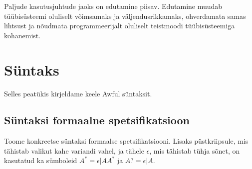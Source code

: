 \documentclass[12pt]{article}
\newcommand\peatykk[1]{
  \clearpage
  \section{#1}}
\begin{document}
      Paljude kasutusjuhtude jaoks on edutamine piisav. Edutamine muudab tüübisüsteemi oluliselt võimsamaks ja väljendusrikkamaks, ohverdamata samas lihtsust ja nõudmata programmeerijalt oluliselt teistmoodi tüübisüsteemiga kohanemist.
\begin{comment}
  \begin{frame}[fragile]{Promotion Without GADT-s?}
    Many GADT-s in the examples have a certain pattern:
    \begin{itemize}
      \item
        The kind of the new type constructor \verb!F! starts with \verb!K L1 ... Ln! where \verb!K! is a kind constructor promoted from an algebraic data type.
      \item
        The first type argument of the resulting \verb!F! is a type constructor applied to some type variables.
      \item
        For every constructor \verb!MakeK! of \verb!K!, we write exactly one data constructor. The first type argument of the resulting \verb!F! is constructed with \verb!MakeK!.
      \item
        For each data constructor that we create, the other type arguments of the resulting \verb!F! are type variables.
      \item
        All type variables used in the resulting \verb!F! are different.
    \end{itemize}
    The two examples shown that do not conform to this rule - \verb!Fin! and \verb!Sum! - can also be done by relaxing only the third rule (allowing zero or more than one data constructor of \verb!F! for each type constructor of \verb!K!).
  \end{frame}
  \begin{frame}[fragile]{Why Not GADT-s?}
    \begin{itemize}
      \item
        Simplicity of use for the programmer.
      \item
        Hopefully simplicity of implementation (type checking and type inference)?
    \end{itemize}
    Many useful applications of promoted kinds are achievable with something much less powerful than GADT-s. GADT-s might be an overkill.
  \end{frame}
\end{comment}
  \peatykk{Süntaks}\label{syntaks}
    Selles peatükis kirjeldame keele Awful süntaksit.
    \subsection{Süntaksi formaalne spetsifikatsioon}
    Toome konkreetse süntaksi formaalse spetsifikatsiooni. Lisaks püstkriipsule, mis tähistab valikut kahe variandi vahel, ja tähele $\epsilon$, mis tähistab tühja sõnet, on kasutatud ka sümboleid $A^*=\epsilon|AA^*$ ja $A?=\epsilon|A$.
\end{document}
